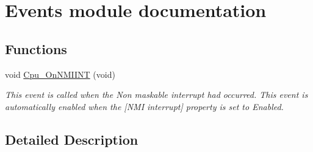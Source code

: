 \hypertarget{group___events__module}{}\section{Events module documentation}
\label{group___events__module}
\subsection*{Functions}
\begin{DoxyCompactItemize}
\item 
\hypertarget{group___events__module_ga960d094664356278ac5472d45a6ea2f3}{}void \hyperlink{group___events__module_ga960d094664356278ac5472d45a6ea2f3}{Cpu\+\_\+\+On\+N\+M\+I\+I\+N\+T} (void)\label{group___events__module_ga960d094664356278ac5472d45a6ea2f3}

\begin{DoxyCompactList}\small\item\em This event is called when the Non maskable interrupt had occurred. This event is automatically enabled when the \mbox{[}N\+M\+I interrupt\mbox{]} property is set to \textquotesingle{}Enabled\textquotesingle{}. \end{DoxyCompactList}\end{DoxyCompactItemize}


\subsection{Detailed Description}
